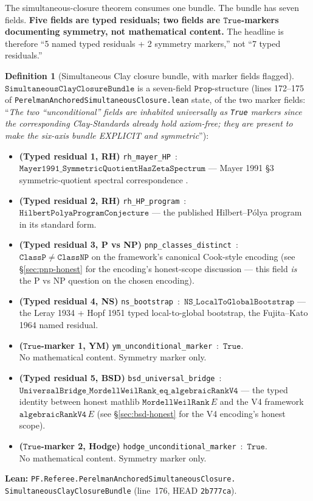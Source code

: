 \documentclass[11pt,a4paper]{article}
\theoremstyle{plain}
\theoremstyle{definition}
\newtheorem{definition}[theorem]{Definition}
\begin{document}
The simultaneous-closure theorem consumes one bundle. The bundle
has seven fields. \textbf{Five fields are typed residuals; two
fields are $\mathtt{True}$-markers documenting symmetry, not
mathematical content.} The headline is therefore ``5 named typed
residuals + 2 symmetry markers,'' not ``7 typed residuals.''

\begin{definition}[Simultaneous Clay closure bundle, with marker
fields flagged]
\label{def:bundle}
$\mathtt{SimultaneousClayClosureBundle}$ is a seven-field
$\mathtt{Prop}$-structure (lines 172--175 of
\texttt{PerelmanAnchoredSimultaneousClosure.lean} state, of the
two marker fields: ``\emph{The two ``unconditional'' fields are
inhabited universally as \texttt{True} markers since the
corresponding Clay-Standards already hold axiom-free; they are
present to make the six-axis bundle EXPLICIT and symmetric}''):
\begin{itemize}[leftmargin=*,nosep]
\item \textbf{(Typed residual 1, RH)} \texttt{rh\_mayer\_HP} \,:\,
  $\mathtt{Mayer1991\_SymmetricQuotientHasZetaSpectrum}$ ---
  Mayer 1991 \S3 symmetric-quotient spectral correspondence
  \cite{mayer1991}.
\item \textbf{(Typed residual 2, RH)} \texttt{rh\_HP\_program}
  \,:\, $\mathtt{HilbertPolyaProgramConjecture}$ --- the
  published Hilbert--P\'olya program in its standard form.
\item \textbf{(Typed residual 3, P vs NP)}
  \texttt{pnp\_classes\_distinct} \,:\, $\mathtt{ClassP} \neq
  \mathtt{ClassNP}$ on the framework's canonical Cook-style
  encoding (see \S\ref{sec:pnp-honest} for the encoding's
  honest-scope discussion --- this field \emph{is} the
  P vs NP question on the chosen encoding).
\item \textbf{(Typed residual 4, NS)} \texttt{ns\_bootstrap}
  \,:\, $\mathtt{NS\_LocalToGlobalBootstrap}$ --- the
  Leray 1934 + Hopf 1951 typed local-to-global bootstrap, the
  Fujita--Kato 1964 named residual.
\item \textbf{($\mathtt{True}$-marker 1, YM)}
  \texttt{ym\_unconditional\_marker} \,:\, $\mathtt{True}$. \\
  No mathematical content. Symmetry marker only.
\item \textbf{(Typed residual 5, BSD)}
  \texttt{bsd\_universal\_bridge} \,:\,
  $\mathtt{UniversalBridge\_MordellWeilRank\_eq\_algebraicRankV4}$
  --- the typed identity between honest mathlib
  $\mathtt{MordellWeilRank}\, E$ and the V4 framework
  $\mathtt{algebraicRankV4}\, E$ (see
  \S\ref{sec:bsd-honest} for the V4 encoding's honest scope).
\item \textbf{($\mathtt{True}$-marker 2, Hodge)}
  \texttt{hodge\_unconditional\_marker} \,:\, $\mathtt{True}$. \\
  No mathematical content. Symmetry marker only.
\end{itemize}
\textbf{Lean:}
\texttt{PF.Referee.PerelmanAnchoredSimultaneousClosure.\\
SimultaneousClayClosureBundle}
(line~176, HEAD \texttt{2b777ca}).
\end{definition}
\end{document}
